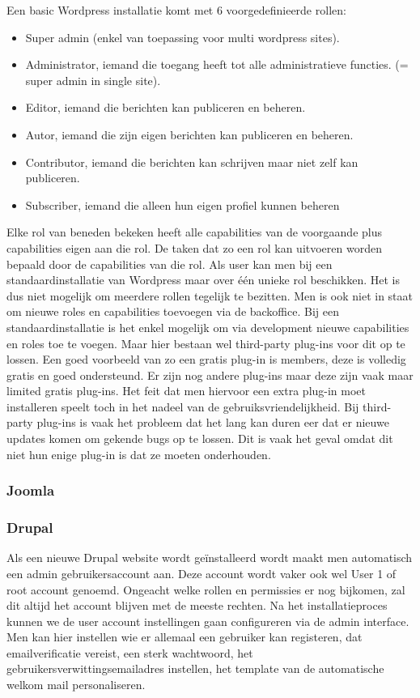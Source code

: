 Een basic Wordpress installatie komt met 6 voorgedefinieerde rollen:
\begin{itemize}
	\item Super admin (enkel van toepassing voor multi wordpress sites).
	\item Administrator, iemand die toegang heeft tot alle administratieve functies. (= super admin in single site).
	\item Editor, iemand die berichten kan publiceren en beheren.
	\item Autor, iemand die zijn eigen berichten kan publiceren en beheren.
	\item Contributor, iemand die berichten kan schrijven maar niet zelf kan publiceren.
	\item Subscriber, iemand die alleen hun eigen profiel kunnen beheren
\end{itemize}
Elke rol van beneden bekeken heeft alle capabilities van de voorgaande plus capabilities eigen aan die rol. De taken dat zo een rol kan uitvoeren worden bepaald door de capabilities van die rol. Als user kan men bij een standaardinstallatie van Wordpress maar over één unieke rol beschikken. Het is dus niet mogelijk om meerdere rollen tegelijk te bezitten. Men is ook niet in staat om nieuwe roles en capabilities toevoegen via de backoffice. Bij een standaardinstallatie is het enkel mogelijk om via development nieuwe capabilities en roles toe te voegen. Maar hier bestaan wel third-party plug-ins voor dit op te lossen. Een goed voorbeeld van zo een gratis plug-in is members, deze is volledig gratis en goed ondersteund. Er zijn nog andere plug-ins maar deze zijn vaak maar limited gratis plug-ins. Het feit dat men hiervoor een extra plug-in moet installeren speelt toch in het nadeel van de gebruiksvriendelijkheid. Bij third-party plug-ins is vaak het probleem dat het lang kan duren eer dat er nieuwe updates komen om gekende bugs op te lossen. Dit is vaak het geval omdat dit niet hun enige plug-in is dat ze moeten onderhouden.

\subsubsection{Joomla}
\subsubsection{Drupal}
Als een nieuwe Drupal website wordt geïnstalleerd wordt maakt men automatisch een admin gebruikersaccount aan. Deze account wordt vaker ook wel User 1 of root account genoemd. Ongeacht welke rollen en permissies er nog bijkomen, zal dit altijd het account blijven met de meeste rechten. Na het installatieproces kunnen we de user account instellingen gaan configureren via de admin interface. Men kan hier instellen wie er allemaal een gebruiker kan registeren, dat emailverificatie vereist, een sterk wachtwoord, het gebruikersverwittingsemailadres instellen, het template van de automatische welkom mail personaliseren.

